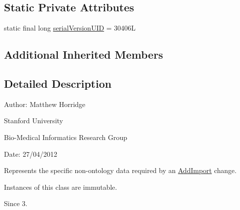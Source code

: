 \subsection*{Static Private Attributes}
\begin{DoxyCompactItemize}
\item 
static final long \hyperlink{classorg_1_1semanticweb_1_1owlapi_1_1change_1_1_add_import_data_a734e6bae391a45001ef804901bce1c3d}{serial\-Version\-U\-I\-D} = 30406\-L
\end{DoxyCompactItemize}
\subsection*{Additional Inherited Members}


\subsection{Detailed Description}
Author\-: Matthew Horridge\par
 Stanford University\par
 Bio-\/\-Medical Informatics Research Group\par
 Date\-: 27/04/2012 

Represents the specific non-\/ontology data required by an \hyperlink{}{Add\-Import} change. 

Instances of this class are immutable. 

\begin{DoxySince}{Since}
3. 
\end{DoxySince}


